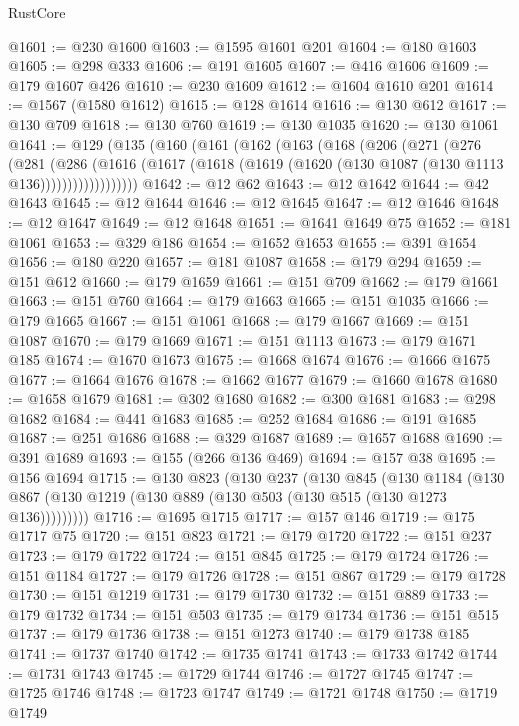 \begin{lexlean}{RustCore}
\begin{coremodule}
@1601 := @230 @1600
@1603 := @1595 @1601 @201
@1604 := @180 @1603
@1605 := @298 @333
@1606 := @191 @1605
@1607 := @416 @1606
@1609 := @179 @1607 @426
@1610 := @230 @1609
@1612 := @1604 @1610 @201
@1614 := @1567 (@1580 @1612)
@1615 := @128 @1614
@1616 := @130 @612
@1617 := @130 @709
@1618 := @130 @760
@1619 := @130 @1035
@1620 := @130 @1061
@1641 := @129
    (@135
      (@160
        (@161
          (@162
            (@163
              (@168
                (@206
                  (@271
                    (@276
                      (@281
                        (@286
                          (@1616
                            (@1617
                              (@1618 (@1619 (@1620 (@130 @1087 (@130 @1113 @136))))))))))))))))))
@1642 := @12 @62
@1643 := @12 @1642
@1644 := @42 @1643
@1645 := @12 @1644
@1646 := @12 @1645
@1647 := @12 @1646
@1648 := @12 @1647
@1649 := @12 @1648
@1651 := @1641 @1649 @75
@1652 := @181 @1061
@1653 := @329 @186
@1654 := @1652 @1653
@1655 := @391 @1654
@1656 := @180 @220
@1657 := @181 @1087
@1658 := @179 @294
@1659 := @151 @612
@1660 := @179 @1659
@1661 := @151 @709
@1662 := @179 @1661
@1663 := @151 @760
@1664 := @179 @1663
@1665 := @151 @1035
@1666 := @179 @1665
@1667 := @151 @1061
@1668 := @179 @1667
@1669 := @151 @1087
@1670 := @179 @1669
@1671 := @151 @1113
@1673 := @179 @1671 @185
@1674 := @1670 @1673
@1675 := @1668 @1674
@1676 := @1666 @1675
@1677 := @1664 @1676
@1678 := @1662 @1677
@1679 := @1660 @1678
@1680 := @1658 @1679
@1681 := @302 @1680
@1682 := @300 @1681
@1683 := @298 @1682
@1684 := @441 @1683
@1685 := @252 @1684
@1686 := @191 @1685
@1687 := @251 @1686
@1688 := @329 @1687
@1689 := @1657 @1688
@1690 := @391 @1689
@1693 := @155 (@266 @136 @469)
@1694 := @157 @38
@1695 := @156 @1694
@1715 := @130
    @823
    (@130
      @237
      (@130
        @845
        (@130
          @1184
          (@130 @867 (@130 @1219 (@130 @889 (@130 @503 (@130 @515 (@130 @1273 @136)))))))))
@1716 := @1695 @1715
@1717 := @157 @146
@1719 := @175 @1717 @75
@1720 := @151 @823
@1721 := @179 @1720
@1722 := @151 @237
@1723 := @179 @1722
@1724 := @151 @845
@1725 := @179 @1724
@1726 := @151 @1184
@1727 := @179 @1726
@1728 := @151 @867
@1729 := @179 @1728
@1730 := @151 @1219
@1731 := @179 @1730
@1732 := @151 @889
@1733 := @179 @1732
@1734 := @151 @503
@1735 := @179 @1734
@1736 := @151 @515
@1737 := @179 @1736
@1738 := @151 @1273
@1740 := @179 @1738 @185
@1741 := @1737 @1740
@1742 := @1735 @1741
@1743 := @1733 @1742
@1744 := @1731 @1743
@1745 := @1729 @1744
@1746 := @1727 @1745
@1747 := @1725 @1746
@1748 := @1723 @1747
@1749 := @1721 @1748
@1750 := @1719 @1749

\end{coremodule}
\end{lexlean}
